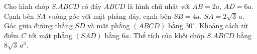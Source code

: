 \begin{ex}
Cho hình chóp $S.ABCD$ có đáy $ABCD$ là hình chữ nhật với $AB=2a$, $AD=6a$. Cạnh bên $SA$ vuông góc với mặt phẳng đáy, cạnh bên $SB=4a$.
\choiceTF
{\True $SA=2\sqrt3\,a$.}
{\True Góc giữa đường thẳng $SD$ và mặt phẳng $(ABCD)$ bằng $30^\circ$.}
{Khoảng cách từ điểm $C$ tới mặt phẳng $(SAD)$ bằng $6a$.}
{\True Thể tích của khối chóp $S.ABCD$ bằng $8\sqrt3\,a^3$.}
\end{ex}
